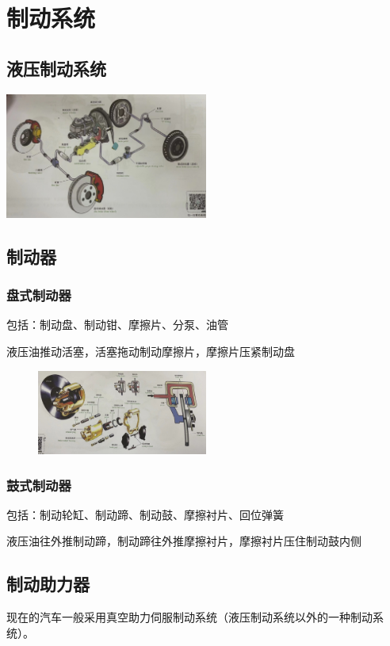 \section{制动系统}
\subsection{液压制动系统}
	\begin{center}
		\includegraphics[width=0.5\textwidth]{3-39}
	\end{center}

\subsection{制动器}
	\subsubsection{盘式制动器}
		包括：制动盘、制动钳、摩擦片、分泵、油管
		
		液压油推动活塞，活塞拖动制动摩擦片，摩擦片压紧制动盘
		
		\begin{figure}[htbp]
			\centering
			\includegraphics[width=0.5\textwidth]{3-40}
		\end{figure}
	\subsubsection{鼓式制动器}
		包括：制动轮缸、制动蹄、制动鼓、摩擦衬片、回位弹簧
		
		液压油往外推制动蹄，制动蹄往外推摩擦衬片，摩擦衬片压住制动鼓内侧
		\clearpage
\subsection{制动助力器}
	现在的汽车一般采用真空助力伺服制动系统（液压制动系统以外的一种制动系统）。
	
